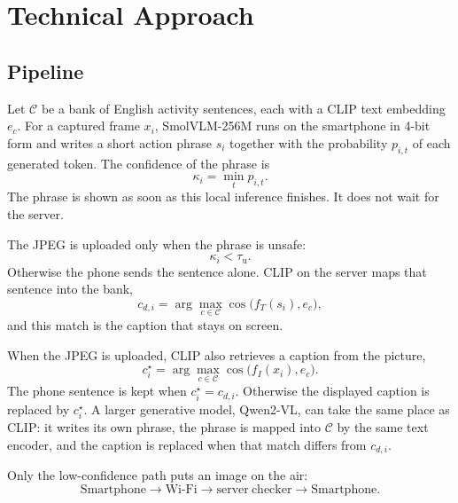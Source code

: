 \section{Technical Approach}

\subsection{Pipeline}

Let $\mathcal{C}$ be a bank of English activity sentences, each with a CLIP
text embedding $e_c$. For a captured frame $x_i$, SmolVLM-256M runs on the
smartphone in 4-bit form and writes a short action phrase $s_i$ together
with the probability $p_{i,t}$ of each generated token. The confidence of
the phrase is
\begin{equation}
\kappa_i
=
\min_t p_{i,t}.
\end{equation}
The phrase is shown as soon as this local inference finishes. It does not
wait for the server.

The JPEG is uploaded only when the phrase is unsafe:
\begin{equation}
\kappa_i < \tau_{\mathrm{u}}.
\end{equation}
Otherwise the phone sends the sentence alone. CLIP on the server maps that
sentence into the bank,
\begin{equation}
c_{d,i}
=
\arg\max_{c\in\mathcal{C}}
\cos\big(f_T(s_i),e_c\big),
\end{equation}
and this match is the caption that stays on screen.

When the JPEG is uploaded, CLIP also retrieves a caption from the picture,
\begin{equation}
c_i^\star
=
\arg\max_{c\in\mathcal{C}}
\cos\big(f_I(x_i),e_c\big).
\end{equation}
The phone sentence is kept when $c_i^\star=c_{d,i}$. Otherwise the displayed
caption is replaced by $c_i^\star$. A larger generative model, Qwen2-VL, can
take the same place as CLIP: it writes its own phrase, the phrase is mapped
into $\mathcal{C}$ by the same text encoder, and the caption is replaced
when that match differs from $c_{d,i}$.

Only the low-confidence path puts an image on the air:
\[
\mathrm{Smartphone}
\rightarrow
\mathrm{Wi\mbox{-}Fi}
\rightarrow
\mathrm{server~checker}
\rightarrow
\mathrm{Smartphone}.
\]

